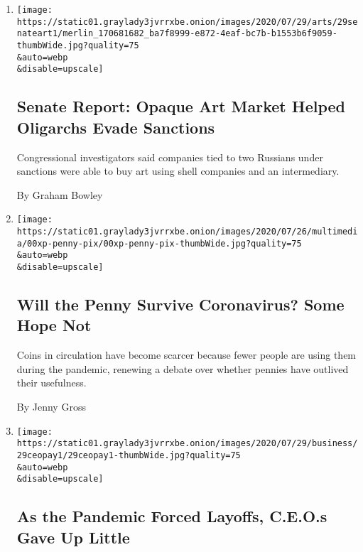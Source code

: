 \begin{enumerate}
\def\labelenumi{\arabic{enumi}.}
\item
  \href{/2020/07/29/arts/design/senate-report-art-market-russia-oligarchs-sanctions.html}{}

  \texttt{[image: https://static01.graylady3jvrrxbe.onion/images/2020/07/29/arts/29senateart1/merlin\_170681682\_ba7f8999-e872-4eaf-bc7b-b1553b6f9059-thumbWide.jpg?quality=75\\\&auto=webp\\\&disable=upscale]}

  \hypertarget{senate-report-opaque-art-market-helped-oligarchs-evade-sanctions}{%
  \subsection{Senate Report: Opaque Art Market Helped Oligarchs Evade
  Sanctions}\label{senate-report-opaque-art-market-helped-oligarchs-evade-sanctions}}

  Congressional investigators said companies tied to two Russians under
  sanctions were able to buy art using shell companies and an
  intermediary.

  By Graham Bowley
\item
  \href{/2020/07/29/business/coin-shortage-penny.html}{}

  \texttt{[image: https://static01.graylady3jvrrxbe.onion/images/2020/07/26/multimedia/00xp-penny-pix/00xp-penny-pix-thumbWide.jpg?quality=75\\\&auto=webp\\\&disable=upscale]}

  \hypertarget{will-the-penny-survive-coronavirus-some-hope-not}{%
  \subsection{Will the Penny Survive Coronavirus? Some Hope
  Not}\label{will-the-penny-survive-coronavirus-some-hope-not}}

  Coins in circulation have become scarcer because fewer people are
  using them during the pandemic, renewing a debate over whether pennies
  have outlived their usefulness.

  By Jenny Gross
\item
  \href{/2020/07/29/business/economy/ceo-pay-pandemic-layoffs.html}{}

  \texttt{[image: https://static01.graylady3jvrrxbe.onion/images/2020/07/29/business/29ceopay1/29ceopay1-thumbWide.jpg?quality=75\\\&auto=webp\\\&disable=upscale]}

  \hypertarget{as-the-pandemic-forced-layoffs-ceos-gave-up-little}{%
  \subsection{As the Pandemic Forced Layoffs, C.E.O.s Gave Up
  Little}\label{as-the-pandemic-forced-layoffs-ceos-gave-up-little}}


\end{enumerate}

